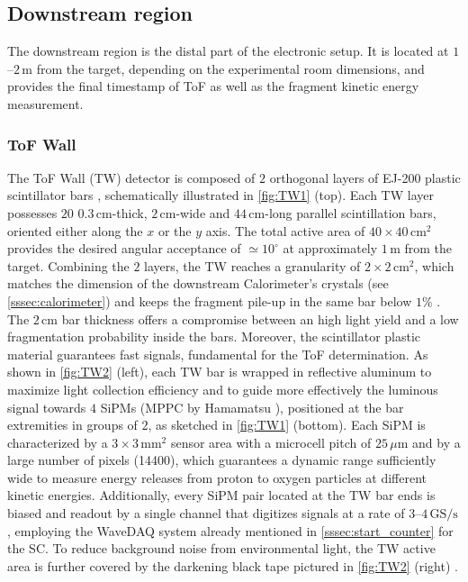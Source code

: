\subsection{Downstream region}\label{ssec:downstream_reg}
The downstream region is the distal part of the electronic setup. It is located at $1$--$2\,\mathrm{m}$ from the target, depending on the experimental room dimensions, and provides the final timestamp of ToF as well as the fragment kinetic energy measurement.
\subsubsection{ToF Wall}\label{sssec:tof_wall}
The ToF Wall (TW) detector is composed of $2$ orthogonal layers of EJ-200 plastic scintillator bars \cite{ej200datasheet}, schematically illustrated in \autoref{fig:TW1} (top). Each TW layer possesses $20$ $0.3\,\mathrm{cm}$-thick, $2\,\mathrm{cm}$-wide and $44\,\mathrm{cm}$-long parallel scintillation bars, oriented either along the $x$ or the $y$ axis. The total active area of $40\times40\,\mathrm{cm}^2$ provides the desired angular acceptance of $\simeq10^\circ$ at approximately $1\,\mathrm{m}$ from the target. Combining the $2$ layers, the TW reaches a granularity of $2\times2\,\mathrm{cm}^2$, which matches the dimension of the downstream Calorimeter's crystals (see \autoref{sssec:calorimeter}) and keeps the fragment pile-up in the same bar below $1\%$ \cite{measurement_impact_foot}. The $2\,\mathrm{cm}$ bar thickness offers a compromise between an high light yield and a low fragmentation probability inside the bars. Moreover, the scintillator plastic material guarantees fast signals, fundamental for the ToF determination. As shown in \autoref{fig:TW2} (left), each TW bar is wrapped in reflective aluminum \cite{MORROCCHI2019116,CIARROCCHI201978} to maximize light collection efficiency and to guide more effectively the luminous signal towards $4$ SiPMs (MPPC by Hamamatsu \cite{sipmTW}), positioned at the bar extremities in groups of $2$, as sketched in \autoref{fig:TW1} (bottom). Each SiPM is characterized by a $3\times3\,\mathrm{mm}^2$ sensor area with a microcell pitch of $25\,\mu\mathrm{m}$ and by a large number of pixels (\num{14400}), which guarantees a dynamic range sufficiently wide to measure energy releases from proton to oxygen particles at different kinetic energies. Additionally, every SiPM pair located at the TW bar ends is biased and readout by a single channel that digitizes signals at a rate of $3$--$4\,\mathrm{GS/s}$, employing the WaveDAQ system \cite{GALLI2019399} already mentioned in \autoref{sssec:start_counter} for the SC. To reduce background noise from environmental light, the TW active area is further covered by the darkening black tape pictured in \autoref{fig:TW2} (right) \cite{MORROCCHI2019116,CIARROCCHI201978}.
